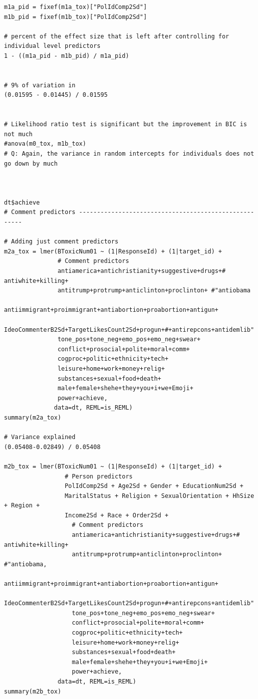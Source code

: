 \documentclass{article}
\begin{document}
\begin{lstlisting}
m1a_pid = fixef(m1a_tox)["PolIdComp2Sd"]
m1b_pid = fixef(m1b_tox)["PolIdComp2Sd"]

# percent of the effect size that is left after controlling for individual level predictors
1 - ((m1a_pid - m1b_pid) / m1a_pid)


# 9% of variation in 
(0.01595 - 0.01445) / 0.01595


# Likelihood ratio test is significant but the improvement in BIC is not much
#anova(m0_tox, m1b_tox)
# Q: Again, the variance in random intercepts for individuals does not go down by much



dt$achieve
# Comment predictors ------------------------------------------------------

# Adding just comment predictors
m2a_tox = lmer(BToxicNum01 ~ (1|ResponseId) + (1|target_id) + 
               # Comment predictors
               antiamerica+antichristianity+suggestive+drugs+# antiwhite+killing+
               antitrump+protrump+anticlinton+proclinton+ #"antiobama
               antiimmigrant+proimmigrant+antiabortion+proabortion+antigun+
               IdeoCommenterB2Sd+TargetLikesCount2Sd+progun+#+antirepcons+antidemlib"
               tone_pos+tone_neg+emo_pos+emo_neg+swear+
               conflict+prosocial+polite+moral+comm+
               cogproc+politic+ethnicity+tech+
               leisure+home+work+money+relig+
               substances+sexual+food+death+
               male+female+shehe+they+you+i+we+Emoji+
               power+achieve, 
              data=dt, REML=is_REML)
summary(m2a_tox)

# Variance explained
(0.05408-0.02849) / 0.05408

m2b_tox = lmer(BToxicNum01 ~ (1|ResponseId) + (1|target_id) + 
                 # Person predictors
                 PolIdComp2Sd + Age2Sd + Gender + EducationNum2Sd + 
                 MaritalStatus + Religion + SexualOrientation + HhSize + Region + 
                 Income2Sd + Race + Order2Sd + 
                   # Comment predictors  
                   antiamerica+antichristianity+suggestive+drugs+# antiwhite+killing+
                   antitrump+protrump+anticlinton+proclinton+ #"antiobama,
                   antiimmigrant+proimmigrant+antiabortion+proabortion+antigun+
                   IdeoCommenterB2Sd+TargetLikesCount2Sd+progun+#+antirepcons+antidemlib"
                   tone_pos+tone_neg+emo_pos+emo_neg+swear+
                   conflict+prosocial+polite+moral+comm+
                   cogproc+politic+ethnicity+tech+
                   leisure+home+work+money+relig+  
                   substances+sexual+food+death+    
                   male+female+shehe+they+you+i+we+Emoji+
                   power+achieve, 
               data=dt, REML=is_REML)
summary(m2b_tox)


\end{lstlisting}
\end{document}
